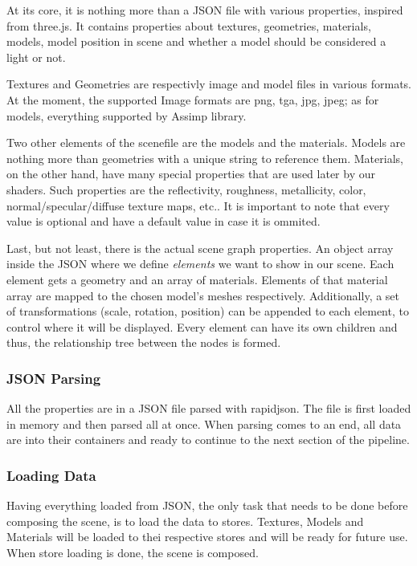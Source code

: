 At its core, it is nothing more than a JSON file with various properties, inspired from three.js\cite{scene:ref1}.
It contains properties about textures, geometries, materials, models, model position in scene and whether a model
should be considered a light or not.

Textures and Geometries are respectivly image and model files in various formats. At the moment, the supported Image
formats are png, tga, jpg, jpeg; as for models, everything supported by Assimp library\cite{scene:ref2}.

Two other elements of the scenefile are the models and the materials. Models are nothing more than geometries with a
unique string to reference them. Materials, on the other hand, have many special properties that are used later by
our shaders. Such properties are the reflectivity, roughness, metallicity, color, normal/specular/diffuse texture
maps, etc.. It is important to note that every value is optional and have a default value in case it is ommited.

Last, but not least, there is the actual scene graph properties. An object array inside the JSON where we define
\textit{elements} we want to show in our scene. Each element gets a geometry and an array of materials. Elements of
that material array are mapped to the chosen model's meshes respectively. Additionally, a set of transformations
(scale, rotation, position) can be appended to each element, to control where it will be displayed. Every element
can have its own children and thus, the relationship tree between the nodes is formed.

\subsubsection{JSON Parsing}
All the properties are in a JSON file parsed with rapidjson\cite{scene:ref3}. The file is first loaded in memory and
then parsed all at once. When parsing comes to an end, all data are into their containers and ready to continue to
the next section of the pipeline.

\subsubsection{Loading Data}
Having everything loaded from JSON, the only task that needs to be done before composing the scene, is to load the
data to stores. Textures, Models and Materials will be loaded to thei respective stores and will be ready for future
use. When store loading is done, the scene is composed.

